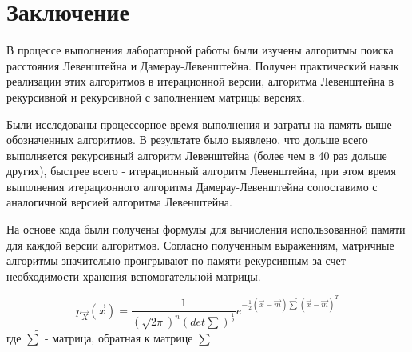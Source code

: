 \documentclass[a4paper,oneside,14pt]{extreport}
\begin{document}
\chapter*{Заключение}
В процессе выполнения лабораторной работы были изучены алгоритмы поиска расстояния Левенштейна и Дамерау-Левенштейна. Получен практический навык реализации этих алгоритмов в итерационной версии, алгоритма Левенштейна в рекурсивной и рекурсивной с заполнением матрицы версиях.

Были исследованы процессорное время выполнения и затраты на память выше обозначенных алгоритмов. В результате было выявлено, что дольше всего выполняется рекурсивный алгоритм Левенштейна (более чем в 40 раз дольше других), быстрее всего - итерационный алгоритм Левенштейна, при этом время выполнения итерационного алгоритма Дамерау-Левенштейна сопоставимо с аналогичной версией алгоритма Левенштейна. 

На основе кода были получены формулы для вычисления использованной памяти для каждой версии алгоритмов. Согласно полученным выражениям, матричные алгоритмы значительно проигрывают по памяти рекурсивным за счет необходимости хранения вспомогательной матрицы.


\newpage
{}



\nocite{*}

\newpage

$$ p_{\vec{X}}(\vec{x}) = \frac{1}{(\sqrt{2\pi})^n (det\sum)^{\frac{1}{2}}} e^{-\frac{1}{2}(\vec{x} - \vec{m})\tilde{\sum}(\vec{x} - \vec{m})^T} $$ где $\tilde{\sum}$ - матрица, обратная к матрице $\sum$
\end{document}
